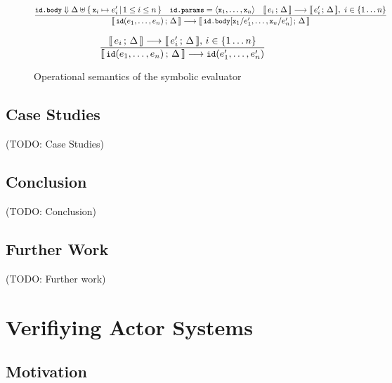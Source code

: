 \documentclass[a4paper,twoside]{article}
\newcommand{\lb}[2]{\llbracket\, #1\,;\, #2\, \rrbracket}
\newcommand{\TODO}[1]{\textcolor{YellowOrange}{(TODO: #1)}} %
\newcommand{\stt}[1]{\texttt{\small{#1}}}
\begin{document}
\begin{landscape}
\begin{figure}[htb]
\begin{framed}
\begin{equation}
\dfrac{
 \stt{id.body} \Downarrow \Delta \uplus \{\,\stt{x}_i \mapsto e_i'\,|\, 1 \leq i \leq n\,\}
 \quad
 \stt{id.params} = \langle \stt{x}_1, \ldots, \stt{x}_n \rangle
 \quad
 \lb{e_i}{\Delta} \longrightarrow \lb{e_i'}{\Delta},\  i \in \{1 \ldots n\}
}{
  \lb{\stt{id}(e_1,\ldots,e_n)}{\Delta} \longrightarrow
  \lb{\stt{id.body}[\stt{x}_1/e_1',\ldots,\stt{x}_n/e_n']}{\Delta}
}
\label{fig:symbolicsem:fi2}
\end{equation}

\begin{equation}
\dfrac{
 \lb{e_i}{\Delta} \longrightarrow \lb{e_i'}{\Delta},\, i \in \{1 \ldots n\}
}{
  \lb{\stt{id}(e_1,\ldots,e_n)}{\Delta} \longrightarrow
  \stt{id}(e_1',\ldots,e_n')
}
\label{fig:symbolicsem:fi3}
\end{equation}

\end{framed}
\vspace{-10pt}
\caption{Operational semantics of the symbolic evaluator \label{fig:symbolicsem}}
\end{figure}
\end{landscape}

\subsection{Case Studies}

\TODO{Case Studies}

\subsection{Conclusion}

\TODO{Conclusion}

\subsection{Further Work}

\TODO{Further work}


\clearpage
\section{Verifiying Actor Systems}
\label{actors}

\subsection{Motivation}
\end{document}
